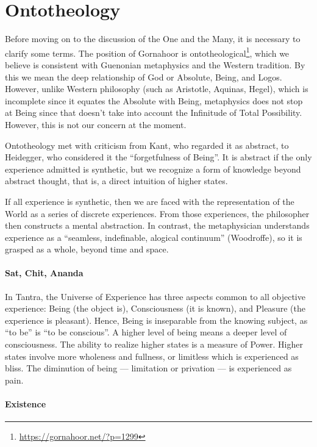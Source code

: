 \section{Ontotheology}

Before moving on to the discussion of the One and the Many, it is necessary to clarify some terms. The position of Gornahoor is ontotheological\footnote{\url{https://gornahoor.net/?p=1299}}, which we believe is consistent with Guenonian metaphysics and the Western tradition. By this we mean the deep relationship of God or Absolute, Being, and Logos. However, unlike Western philosophy (such as Aristotle, Aquinas, Hegel), which is incomplete since it equates the Absolute with Being, metaphysics does not stop at Being since that doesn't take into account the Infinitude of Total Possibility. However, this is not our concern at the moment.

Ontotheology met with criticism from Kant, who regarded it as abstract, to Heidegger, who considered it the ``forgetfulness of Being''. It is abstract if the only experience admitted is synthetic, but we recognize a form of knowledge beyond abstract thought, that is, a direct intuition of higher states.

If all experience is synthetic, then we are faced with the representation of the World as a series of discrete experiences. From those experiences, the philosopher then constructs a mental abstraction. In contrast, the metaphysician understands experience as a ``seamless, indefinable, alogical continuum'' (Woodroffe), so it is grasped as a whole, beyond time and space.

\paragraph{Sat, Chit, Ananda}


In Tantra, the Universe of Experience has three aspects common to all objective experience: Being (the object is), Consciousness (it is known), and Pleasure (the experience is pleasant). Hence, Being is inseparable from the knowing subject, as ``to be'' is ``to be conscious''. A higher level of being means a deeper level of consciousness. The ability to realize higher states is a measure of Power. Higher states involve more wholeness and fullness, or limitless which is experienced as bliss. The diminution of being --- limitation or privation --- is experienced as pain.

\paragraph{Existence}

